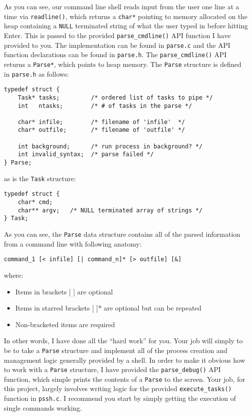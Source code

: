 \documentclass[10pt]{article}
\begin{document}
As you can see, our command line shell reads input from the user one
line at a time via \texttt{readline()}, which returns a \texttt{char*}
pointing to memory allocated on the heap containing a \texttt{NULL}
terminated string of what the user typed in before hitting Enter.  This
is passed to the provided \texttt{parse\_cmdline()} API function I have
provided to you.  The implementation can be found in \texttt{parse.c}
and the API function declarations can be found in \texttt{parse.h}.  The
\texttt{parse\_cmdline()} API returns a \texttt{Parse*}, which points to
heap memory.  The \texttt{Parse} structure is defined in
\texttt{parse.h} as follows:

\begin{verbatim}
typedef struct {
    Task* tasks;         /* ordered list of tasks to pipe */
    int   ntasks;        /* # of tasks in the parse */

    char* infile;        /* filename of 'infile'  */
    char* outfile;       /* filename of 'outfile' */

    int background;      /* run process in background? */
    int invalid_syntax;  /* parse failed */
} Parse;
\end{verbatim}

as is the \texttt{Task} structure:

\begin{verbatim}
typedef struct {
    char* cmd;
    char** argv;   /* NULL terminated array of strings */
} Task;
\end{verbatim}

As you can see, the \texttt{Parse} data structure contains all of the
parsed information from a command line with following anatomy:

\begin{verbatim}
command_1 [< infile] [| command_n]* [> outfile] [&]
\end{verbatim}

where:

\begin{itemize}
    \item Items in brackets [ ] are optional
    \item Items in starred brackets [ ]* are optional but can be repeated
    \item Non-bracketed items are required
\end{itemize}

In other words, I have done all the ``hard work'' for you.  Your job
will simply to be to take a \texttt{Parse} structure and implement all
of the process creation and management logic generally provided by a
shell.  In order to make it obvious how to work with a \texttt{Parse}
structure, I have provided the \texttt{parse\_debug()} API function,
which simple prints the contents of a \texttt{Parse} to the screen.
Your job, for this project, largely involves writing logic for the
provided \texttt{execute\_tasks()} function in \texttt{pssh.c}.  I
recommend you start by simply getting the execution of single commands
working.
\end{document}
